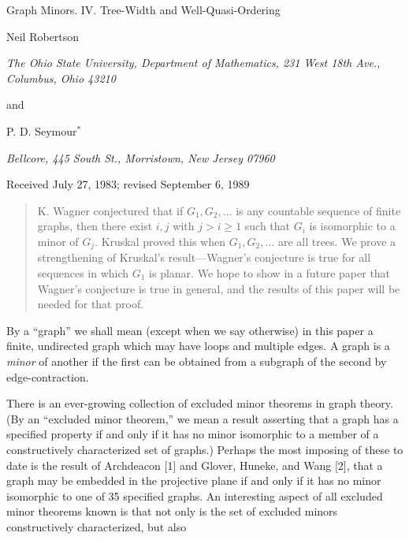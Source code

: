{\centering
{\Large Graph Minors. IV. Tree-Width and Well-Quasi-Ordering\par}\medskip

Neil Robertson\par
\textit{The Ohio State University, Department of Mathematics, 231 West 18th Ave., Columbus, Ohio 43210}\par
and\par
P. D. Seymour$^*$\par
\textit{Bellcore, 445 South St., Morristown, New Jersey 07960}\par
Received July 27, 1983; revised September 6, 1989\par
}
\begin{quote}
K. Wagner conjectured that if $G_1, G_2, \dots$ is any countable sequence of finite graphs, then there exist $i, j$ with $j > i \ge 1$ such that $G_i$ is isomorphic to a minor of $G_j$. Kruskal proved this when $G_1, G_2, \dots$ are all trees. We prove a strengthening of Kruskal's result---Wagner's conjecture is true for all sequences in which $G_1$ is planar. We hope to show in a future paper that Wagner's conjecture is true in general, and the results of this paper will be needed for that proof.

\end{quote}


By a ``graph'' we shall mean (except when we say otherwise) in this paper a finite, undirected graph which may have loops and multiple edges. A graph is a \textit{minor} of another if the first can be obtained from a subgraph of the second by edge-contraction.

There is an ever-growing collection of excluded minor theorems in graph theory. (By an ``excluded minor theorem,'' we mean a result asserting that a graph has a specified property if and only if it has no minor isomorphic to a member of a constructively characterized set of graphs.) Perhaps the most imposing of these to date is the result of Archdeacon [1] and Glover, Huneke, and Wang [2], that a graph may be embedded in the projective plane if and only if it has no minor isomorphic to one of 35 specified graphs. An interesting aspect of all excluded minor theorems known is that not only is the set of excluded minors constructively characterized, but also%
